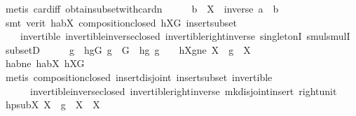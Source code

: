 \begin{isabellebody}
\ {\isacharparenleft}{\kern0pt}metis\ card{\isacharunderscore}{\kern0pt}{}{\isacharunderscore}{\kern0pt}iff\ obtain{\isacharunderscore}{\kern0pt}subset{\isacharunderscore}{\kern0pt}with{\isacharunderscore}{\kern0pt}card{\isacharunderscore}{\kern0pt}n{\isacharparenright}{\kern0pt}\isanewline
\ \ \isamarkupfalse%
\ \isamarkupfalse%
\ {\isachardoublequoteopen}b\ {\isasymin}\ X\ {\isasymcdots}\ {\isacharbraceleft}{\kern0pt}inverse\ a\ {\isasymcdot}\ b{\isacharbraceright}{\kern0pt}{\isachardoublequoteclose}\ \isamarkupfalse%
\ {\isacharparenleft}{\kern0pt}smt\ {\isacharparenleft}{\kern0pt}verit{\isacharparenright}{\kern0pt}\ habX\ composition{\isacharunderscore}{\kern0pt}closed\ hXG\ insert{\isacharunderscore}{\kern0pt}subset\ \isanewline
\ \ \ \ invertible\ invertible{\isacharunderscore}{\kern0pt}inverse{\isacharunderscore}{\kern0pt}closed\ invertible{\isacharunderscore}{\kern0pt}right{\isacharunderscore}{\kern0pt}inverse{}\ singletonI\ smul{\isachardot}{\kern0pt}smulI\ subsetD{\isacharparenright}{\kern0pt}\isanewline
\ \ \isamarkupfalse%
\ \isamarkupfalse%
\ g\ \ hgG{\isacharcolon}{\kern0pt}\ {\isachardoublequoteopen}g\ {\isasymin}\ G{\isachardoublequoteclose}\ \ hg{}{\isacharcolon}{\kern0pt}\ {\isachardoublequoteopen}g\ {\isasymnoteq}\ {\isasymone}{\isachardoublequoteclose}\ \ hXgne{\isacharcolon}{\kern0pt}\ {\isachardoublequoteopen}{\isacharparenleft}{\kern0pt}X\ {\isasymcdots}\ {\isacharbraceleft}{\kern0pt}g{\isacharbraceright}{\kern0pt}{\isacharparenright}{\kern0pt}\ {\isasyminter}\ X\ {\isasymnoteq}\ {\isacharbraceleft}{\kern0pt}{\isacharbraceright}{\kern0pt}{\isachardoublequoteclose}\ \isanewline
\ \ \ \ \isamarkupfalse%
\ habne\ habX\ hXG\ \isamarkupfalse%
\ {\isacharparenleft}{\kern0pt}metis\ composition{\isacharunderscore}{\kern0pt}closed\ insert{\isacharunderscore}{\kern0pt}disjoint{\isacharparenleft}{\kern0pt}{}{\isacharparenright}{\kern0pt}\ insert{\isacharunderscore}{\kern0pt}subset\ invertible\ \isanewline
\ \ \ \ \ \ invertible{\isacharunderscore}{\kern0pt}inverse{\isacharunderscore}{\kern0pt}closed\ invertible{\isacharunderscore}{\kern0pt}right{\isacharunderscore}{\kern0pt}inverse{}\ mk{\isacharunderscore}{\kern0pt}disjoint{\isacharunderscore}{\kern0pt}insert\ right{\isacharunderscore}{\kern0pt}unit{\isacharparenright}{\kern0pt}\isanewline
\ \ \isamarkupfalse%
\ hpsubX{\isacharcolon}{\kern0pt}\ {\isachardoublequoteopen}{\isacharparenleft}{\kern0pt}X\ {\isasymcdots}\ {\isacharbraceleft}{\kern0pt}g{\isacharbraceright}{\kern0pt}{\isacharparenright}{\kern0pt}\ {\isasyminter}\ X\ {\isasymsubset}\ X{\isachardoublequoteclose}\isanewline

\end{isabellebody}
